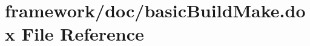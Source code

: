 \hypertarget{basic_build_make_8dox}{}\section{framework/doc/basic\+Build\+Make.dox File Reference}
\label{basic_build_make_8dox}

